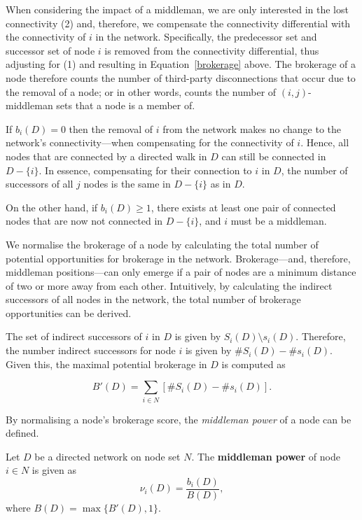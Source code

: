 When considering the impact of a middleman, we are only interested in the lost connectivity (2) and, therefore, we compensate the connectivity differential with the connectivity of $i$ in the network. Specifically, the predecessor set and successor set of node $i$ is removed from the connectivity differential, thus adjusting for (1) and resulting in Equation~\ref{brokerage} above. The brokerage of a node therefore counts the number of third-party disconnections that occur due to the removal of a node; or in other words, counts the number of $(i,j)$-middleman sets that a node is a member of.

If $b_{i}(D) = 0$ then the removal of $i$ from the network makes no change to the network's connectivity---when compensating for the connectivity of $i$. Hence, all nodes that are connected by a directed walk in $D$ can still be connected in $D - \{i\}$. In essence, compensating for their connection to $i$ in $D$, the number of successors of all $j$ nodes is the same in $D - \{i\}$ as in $D$.

On the other hand, if $b_{i}(D) \geqslant 1$, there exists at least one pair of connected nodes that are now not connected in $D - \{i\}$, and $i$ must be a middleman.

\medskip\noindent We normalise the brokerage of a node by calculating the total number of potential opportunities for brokerage in the network. Brokerage---and, therefore, middleman positions---can only emerge if a pair of nodes are a minimum distance of two or more away from each other. Intuitively, by calculating the indirect successors of all nodes in the network, the total number of brokerage opportunities can be derived.

The set of indirect successors of $i$ in $D$ is given by $S_{i}(D) \setminus s_{i}(D)$. Therefore, the number indirect successors for node $i$ is given by $\# S_{i}(D) - \# s_{i}(D)$. Given this, the maximal potential brokerage in $D$ is computed as

\begin{equation} \label{normalisation}
B'(D) = \sum_{i \in N} \left[ \# S_{i}(D) - \# s_{i}(D) \right] .
\end{equation}

By normalising a node's brokerage score, the \emph{middleman power} of a node can be defined.

\begin{definition} \label{middlemanpower}
Let $D$ be a directed network on node set $N$. The \textbf{middleman power} of node $i \in N$ is given as
\begin{equation} \label{mmpowerindex}
\nu_{i}(D) = \frac{b_{i}(D)}{B(D)} ,
\end{equation}
where $B(D) = \max \{ B'(D) , 1\}$.
\end{definition}

